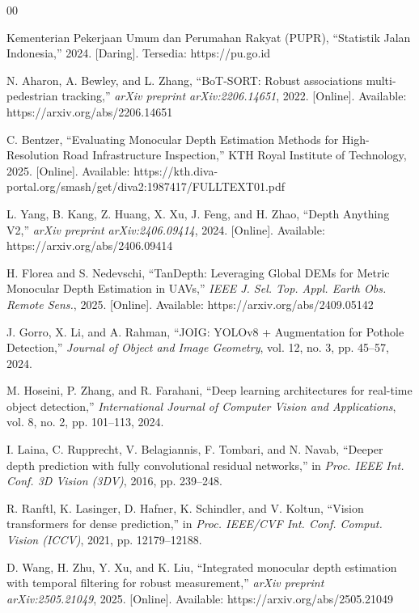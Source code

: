 \documentclass{iopjournal}
\begin{document}
\begin{thebibliography}{00}

Kementerian Pekerjaan Umum dan Perumahan Rakyat (PUPR), ``Statistik Jalan Indonesia,'' 2024. [Daring]. Tersedia: https://pu.go.id

N. Aharon, A. Bewley, and L. Zhang, ``BoT-SORT: Robust associations multi-pedestrian tracking,'' \emph{arXiv preprint arXiv:2206.14651}, 2022. [Online]. Available: https://arxiv.org/abs/2206.14651

C. Bentzer, ``Evaluating Monocular Depth Estimation Methods for High-Resolution Road Infrastructure Inspection,'' KTH Royal Institute of Technology, 2025. [Online]. Available: https://kth.diva-portal.org/smash/get/diva2:1987417/FULLTEXT01.pdf

L. Yang, B. Kang, Z. Huang, X. Xu, J. Feng, and H. Zhao, ``Depth Anything V2,'' \emph{arXiv preprint arXiv:2406.09414}, 2024. [Online]. Available: https://arxiv.org/abs/2406.09414

H. Florea and S. Nedevschi, ``TanDepth: Leveraging Global DEMs for Metric Monocular Depth Estimation in UAVs,'' \emph{IEEE J. Sel. Top. Appl. Earth Obs. Remote Sens.}, 2025. [Online]. Available: https://arxiv.org/abs/2409.05142

J. Gorro, X. Li, and A. Rahman, ``JOIG: YOLOv8 + Augmentation for Pothole Detection,'' \emph{Journal of Object and Image Geometry}, vol. 12, no. 3, pp. 45--57, 2024.

M. Hoseini, P. Zhang, and R. Farahani, ``Deep learning architectures for real-time object detection,'' \emph{International Journal of Computer Vision and Applications}, vol. 8, no. 2, pp. 101--113, 2024.

I. Laina, C. Rupprecht, V. Belagiannis, F. Tombari, and N. Navab, ``Deeper depth prediction with fully convolutional residual networks,'' in \emph{Proc. IEEE Int. Conf. 3D Vision (3DV)}, 2016, pp. 239--248.

R. Ranftl, K. Lasinger, D. Hafner, K. Schindler, and V. Koltun, ``Vision transformers for dense prediction,'' in \emph{Proc. IEEE/CVF Int. Conf. Comput. Vision (ICCV)}, 2021, pp. 12179--12188.

D. Wang, H. Zhu, Y. Xu, and K. Liu, ``Integrated monocular depth estimation with temporal filtering for robust measurement,'' \emph{arXiv preprint arXiv:2505.21049}, 2025. [Online]. Available: https://arxiv.org/abs/2505.21049


\end{thebibliography}
\end{document}
